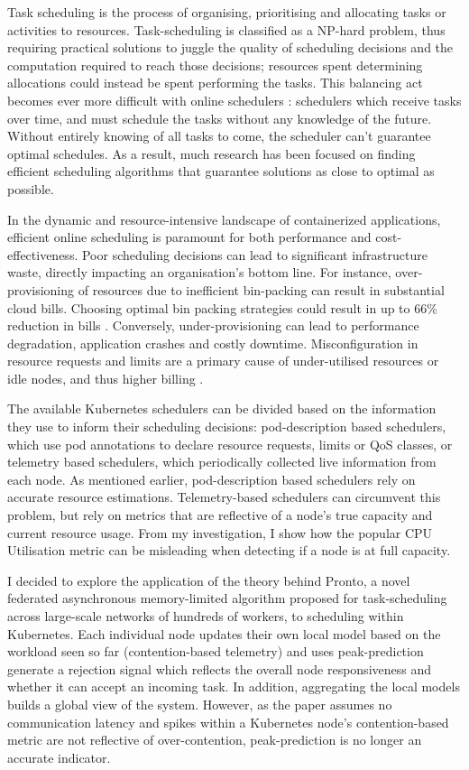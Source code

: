 Task scheduling is the process of organising, prioritising and allocating tasks
or activities to resources. Task-scheduling is classified as a NP-hard problem,
thus requiring practical solutions to juggle the quality of scheduling decisions
and the computation required to reach those decisions; resources spent
determining allocations could instead be spent performing the tasks. This
balancing act becomes ever more difficult with online schedulers
\cite{pruhs2004online}: schedulers which receive tasks over time, and must
schedule the tasks without any knowledge of the future. Without entirely knowing
of all tasks to come, the scheduler can't guarantee optimal schedules. As a
result, much research has been focused on finding efficient scheduling
algorithms that guarantee solutions as close to optimal as possible.

In the dynamic and resource-intensive landscape of containerized applications,
efficient online scheduling is paramount for both performance and
cost-effectiveness. Poor scheduling decisions can lead to significant
infrastructure waste, directly impacting an organisation's bottom line. For
instance, over-provisioning of resources due to inefficient bin-packing can
result in substantial cloud bills. Choosing optimal bin packing strategies could
result in up to 66\% reduction in bills
\cite{bin-packing-and-cost-savings-in-kubernetes-clusters-on-aws}. Conversely,
under-provisioning can lead to performance degradation, application crashes and
costly downtime. Misconfiguration in resource requests and limits are a
primary cause of under-utilised resources or idle nodes, and thus higher
billing \cite{cost-strategies}.

The available Kubernetes schedulers can be divided based on the information they
use to inform their scheduling decisions: pod-description based schedulers,
which use pod annotations to declare resource requests, limits or QoS classes,
or telemetry based schedulers, which periodically collected live information
from each node. As mentioned earlier, pod-description based schedulers rely on
accurate resource estimations. Telemetry-based schedulers can circumvent this
problem, but rely on metrics that are reflective of a node's true capacity and
current resource usage. From my investigation, I show how the popular CPU
Utilisation metric can be misleading when detecting if a node is at full
capacity.

I decided to explore the application of the theory behind Pronto, a novel
federated asynchronous memory-limited algorithm proposed for task-scheduling
across large-scale networks of hundreds of workers, to scheduling within
Kubernetes. Each individual node updates their own local model based on the
workload seen so far (contention-based telemetry) and uses peak-prediction
generate a rejection signal which reflects the overall node responsiveness and
whether it can accept an incoming task. In addition, aggregating the local
models builds a global view of the system. However, as the paper assumes no
communication latency and spikes within a Kubernetes node's contention-based
metric are not reflective of over-contention, peak-prediction is no longer an
accurate indicator.

